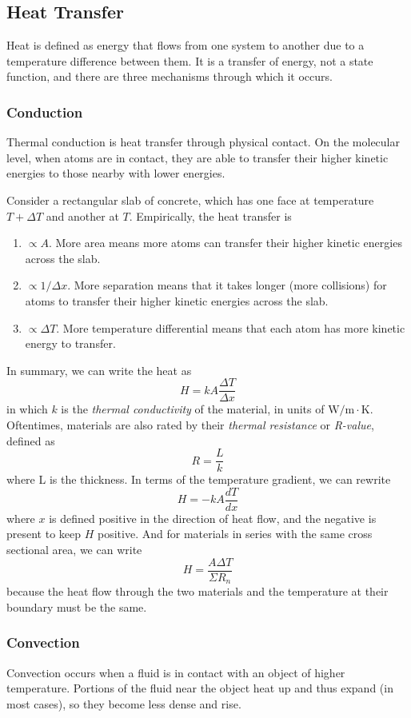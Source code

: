 \documentclass[../PhysicsFormulae.tex]{subfiles}
\begin{document}
\subsection{Heat Transfer}
Heat is defined as energy that flows from one system to another due to a temperature difference between them. It is a transfer of energy, not a state function, and there are three mechanisms through which it occurs. 

\subsubsection{Conduction}
Thermal conduction is heat transfer through physical contact. On the molecular level, when atoms are in contact, they are able to transfer their higher kinetic energies to those nearby with lower energies. \bigskip

Consider a rectangular slab of concrete, which has one face at temperature $T + \Delta T$ and another at $T$. Empirically, the heat transfer is 
\begin{enumerate}
    \item $\propto A$. More area means more atoms can transfer their higher kinetic energies across the slab. 
    \item $\propto 1/\Delta x$. More separation means that it takes longer (more collisions) for atoms to transfer their higher kinetic energies across the slab. 
    \item $\propto \Delta T$. More temperature differential means that each atom has more kinetic energy to transfer.
\end{enumerate}
In summary, we can write the heat as 
\[ H = kA\frac{\Delta T}{\Delta x} \] 
in which $k$ is the \textit{thermal conductivity} of the material, in units of $\mathrm{W/m \cdot K}$. Oftentimes, materials are also rated by their \textit{thermal resistance} or \textit{R-value}, defined as 
\[ R = \frac{L}{k} \] 
where L is the thickness. In terms of the temperature gradient, we can rewrite
\[ H = -kA\frac{dT}{dx} \] 
where $x$ is defined positive in the direction of heat flow, and the negative is present to keep $H$ positive. And for materials in series with the same cross sectional area, we can write 
\[ H = \frac{A\Delta T}{\Sigma R_n} \] 
because the heat flow through the two materials and the temperature at their boundary must be the same. 

\subsubsection{Convection}
Convection occurs when a fluid is in contact with an object of higher temperature. Portions of the fluid near the object heat up and thus expand (in most cases), so they become less dense and rise.
\end{document}
